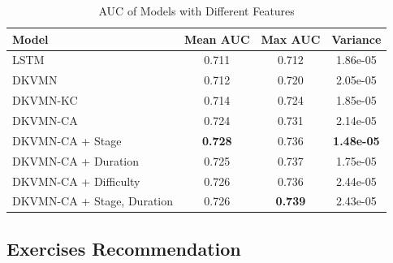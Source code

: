 \documentclass{edm_template}
\begin{document}
\begin{table}
\centering
\caption{AUC of Models with Different Features}
\label{addfeature}
\begin{tabular}{|p{2.3cm}|c|c|c|} \hline
Model&Mean AUC&Max AUC&Variance\\ \hline
LSTM & 0.711 & 0.712 & 1.86e-05\\ \hline
DKVMN & 0.712& 0.720 & 2.05e-05\\ \hline
DKVMN-KC & 0.714& 0.724 & 1.85e-05\\ \hline
DKVMN-CA& 0.724& 0.731 & 2.14e-05\\ \hline
DKVMN-CA + Stage & \textbf{0.728}& 0.736 & \textbf{1.48e-05}\\ \hline
DKVMN-CA + Duration & 0.725& 0.737 & 1.75e-05\\ \hline
DKVMN-CA + Difficulty & 0.726& 0.736 & 2.44e-05\\ \hline
DKVMN-CA + Stage, Duration& 0.726& \textbf{0.739} & 2.43e-05\\ \hline
\end{tabular}
\end{table}



\subsection{Exercises Recommendation}

\end{document}
